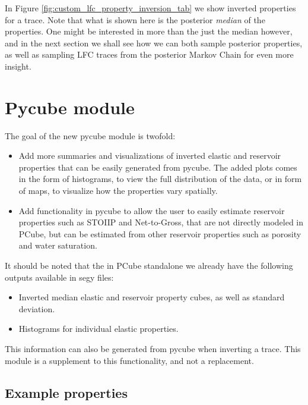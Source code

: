 \documentclass[note,screen,english,12pt,utf8]{nrdoc}
\begin{document}
In Figure \ref{fig:custom_lfc_property_inversion_tab} we show inverted properties
for a trace. Note that what is shown here is the posterior \textit{median} of the
properties. One might be interested in more than the just the median however, and
in the next section we shall see how we can both sample posterior properties,
as well as sampling LFC traces from the posterior Markov Chain for even more insight.

\section{Pycube module}

The goal of the new pycube module is twofold:
\begin{itemize}
    \item {
        Add more summaries and visualizations of inverted elastic and
        reservoir properties that can be easily generated from pycube.
        The added plots comes in the form of histograms, to view the
        full distribution of the data, or in form of maps, to visualize
        how the properties vary spatially.
    }
    \item{
        Add functionality in pycube to allow the user to easily estimate
        reservoir properties such as STOIIP and Net-to-Gross, that are not
        directly modeled in PCube, but can be estimated from
        other reservoir properties such as porosity and water saturation.
    }

\end{itemize}


It should be noted that the in PCube standalone we already have
the following outputs available in segy files:

\begin{itemize}
    \item Inverted median elastic and reservoir property cubes, as well as standard deviation.
    \item Histograms for individual elastic properties.
\end{itemize}

This information can also be generated from pycube when inverting a trace.
This module is a supplement to this functionality, and not a replacement.


\subsection{Example properties}
\label{sec:examples}
\end{document}
